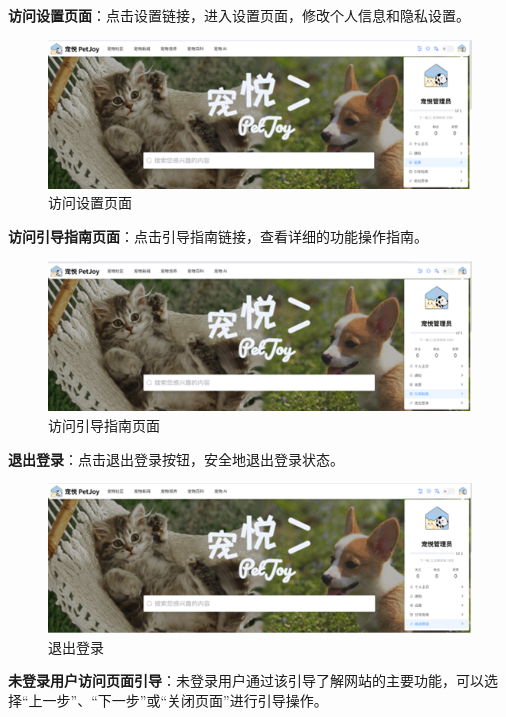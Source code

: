 \begin{itemize}
	\textbf{访问设置页面}：点击设置链接，进入设置页面，修改个人信息和隐私设置。

	\begin{figure}[H]
		\centering
		\includegraphics[scale=0.8]{figures/TopNavigationBar9.png} 
		\caption{访问设置页面}
	\end{figure}

	\textbf{访问引导指南页面}：点击引导指南链接，查看详细的功能操作指南。

	\begin{figure}[H]
		\centering
		\includegraphics[scale=0.8]{figures/TopNavigationBar10.png} 
		\caption{访问引导指南页面}
	\end{figure}

	\textbf{退出登录}：点击退出登录按钮，安全地退出登录状态。
	
	\begin{figure}[H]
		\centering
		\includegraphics[scale=0.8]{figures/TopNavigationBar11.png} 
		\caption{退出登录}
	\end{figure}

	\textbf{未登录用户访问页面引导}：未登录用户通过该引导了解网站的主要功能，可以选择“上一步”、“下一步”或“关闭页面”进行引导操作。


\end{itemize}
